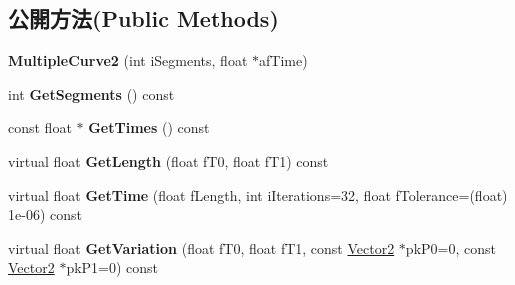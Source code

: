 \subsection*{公開方法(Public Methods)}
\begin{DoxyCompactItemize}
\item 
{\bfseries Multiple\+Curve2} (int i\+Segments, float $\ast$af\+Time)\hypertarget{class_i_dream_sky_1_1_multiple_curve2_a57fbe3bab814e45d4223e6bc068b8c14}{}\label{class_i_dream_sky_1_1_multiple_curve2_a57fbe3bab814e45d4223e6bc068b8c14}

\item 
int {\bfseries Get\+Segments} () const \hypertarget{class_i_dream_sky_1_1_multiple_curve2_a019e597dcfd4db4084aeee5091bbc4ea}{}\label{class_i_dream_sky_1_1_multiple_curve2_a019e597dcfd4db4084aeee5091bbc4ea}

\item 
const float $\ast$ {\bfseries Get\+Times} () const \hypertarget{class_i_dream_sky_1_1_multiple_curve2_a5de46dfaa27199e7e6b4dcbb9efc67d4}{}\label{class_i_dream_sky_1_1_multiple_curve2_a5de46dfaa27199e7e6b4dcbb9efc67d4}

\item 
virtual float {\bfseries Get\+Length} (float f\+T0, float f\+T1) const \hypertarget{class_i_dream_sky_1_1_multiple_curve2_a82c2ec1f05f41c86dd6bc06c39ec3561}{}\label{class_i_dream_sky_1_1_multiple_curve2_a82c2ec1f05f41c86dd6bc06c39ec3561}

\item 
virtual float {\bfseries Get\+Time} (float f\+Length, int i\+Iterations=32, float f\+Tolerance=(float) 1e-\/06) const \hypertarget{class_i_dream_sky_1_1_multiple_curve2_ab28f3c890a96f72e504f2eb2bef9aefc}{}\label{class_i_dream_sky_1_1_multiple_curve2_ab28f3c890a96f72e504f2eb2bef9aefc}

\item 
virtual float {\bfseries Get\+Variation} (float f\+T0, float f\+T1, const \hyperlink{class_i_dream_sky_1_1_vector2}{Vector2} $\ast$pk\+P0=0, const \hyperlink{class_i_dream_sky_1_1_vector2}{Vector2} $\ast$pk\+P1=0) const \hypertarget{class_i_dream_sky_1_1_multiple_curve2_ae9fc2ffa4a30d4d4ce8b90861553d5f4}{}\label{class_i_dream_sky_1_1_multiple_curve2_ae9fc2ffa4a30d4d4ce8b90861553d5f4}

\end{DoxyCompactItemize}
